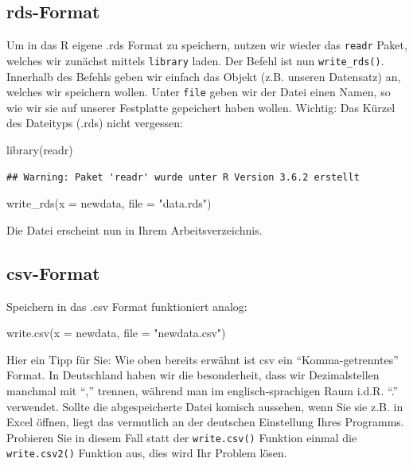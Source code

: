 \documentclass[
]{book}
\newenvironment{Shaded}{\begin{snugshade}}{\end{snugshade}}
\newcommand{\AttributeTok}[1]{\textcolor[rgb]{0.77,0.63,0.00}{#1}}
\newcommand{\FunctionTok}[1]{\textcolor[rgb]{0.00,0.00,0.00}{#1}}
\newcommand{\NormalTok}[1]{#1}
\newcommand{\StringTok}[1]{\textcolor[rgb]{0.31,0.60,0.02}{#1}}
\begin{document}
\hypertarget{rds-format-1}{%
\subsection{rds-Format}\label{rds-format-1}}

Um in das R eigene .rds Format zu speichern, nutzen wir wieder das \texttt{readr} Paket, welches wir zunächst mittels \texttt{library} laden. Der Befehl ist nun \texttt{write\_rds()}. Innerhalb des Befehls geben wir einfach das Objekt (z.B. unseren Datensatz) an, welches wir speichern wollen. Unter \texttt{file} geben wir der Datei einen Namen, so wie wir sie auf unserer Festplatte gepeichert haben wollen. Wichtig: Das Kürzel des Dateityps (.rds) nicht vergessen:

\begin{Shaded}
\begin{Highlighting}[]
\FunctionTok{library}\NormalTok{(readr)}
\end{Highlighting}
\end{Shaded}

\begin{verbatim}
## Warning: Paket 'readr' wurde unter R Version 3.6.2 erstellt
\end{verbatim}

\begin{Shaded}
\begin{Highlighting}[]
\FunctionTok{write\_rds}\NormalTok{(}\AttributeTok{x =}\NormalTok{ newdata, }\AttributeTok{file =} \StringTok{"data.rds"}\NormalTok{)}
\end{Highlighting}
\end{Shaded}

Die Datei erscheint nun in Ihrem Arbeitsverzeichnis.

\hypertarget{csv-format-1}{%
\subsection{csv-Format}\label{csv-format-1}}

Speichern in das .csv Format funktioniert analog:

\begin{Shaded}
\begin{Highlighting}[]
\FunctionTok{write.csv}\NormalTok{(}\AttributeTok{x =}\NormalTok{ newdata, }\AttributeTok{file =} \StringTok{"newdata.csv"}\NormalTok{)}
\end{Highlighting}
\end{Shaded}

Hier ein Tipp für Sie: Wie oben bereits erwähnt ist csv ein ``Komma-getrenntes'' Format. In Deutschland haben wir die besonderheit, dass wir Dezimalstellen manchmal mit ``,'' trennen, während man im englisch-sprachigen Raum i.d.R. ``.'' verwendet. Sollte die abgespeicherte Datei komisch aussehen, wenn Sie sie z.B. in Excel öffnen, liegt das vermutlich an der deutschen Einstellung Ihres Programms. Probieren Sie in diesem Fall statt der \texttt{write.csv()} Funktion einmal die \texttt{write.csv2()} Funktion aus, dies wird Ihr Problem lösen.
\end{document}
